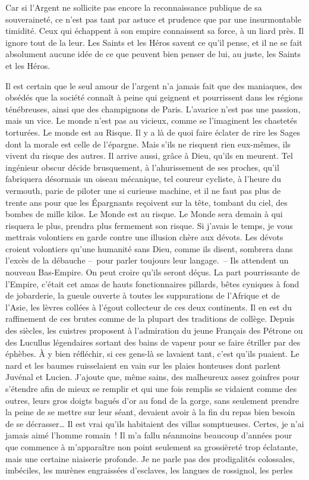 \documentclass[french,twoside]{book} %
\newcommand{\astertri}{\medskip\par\centerline{\color{rubric}\large\selectfont{\syms ✻\,✻\,✻}}\medskip\par}%
\begin{document}
\astertri

\noindent Car si l’Argent ne sollicite pas encore la reconnaissance publique de sa souveraineté, ce n’est pas tant par astuce et prudence que par une insurmontable timidité. Ceux qui échappent à son empire connaissent sa force, à un liard près. Il ignore tout de la leur. Les Saints et les Héros savent ce qu’il pense, et il ne se fait absolument aucune idée de ce que peuvent bien penser de lui, au juste, les Saints et les Héros.\par
Il est certain que le seul amour de l’argent n’a jamais fait que des maniaques, des obsédés que la société connaît à peine qui geignent et pourrissent dans les régions ténébreuses, ainsi que des champignons de Paris. L’avarice n’est pas une passion, mais un vice. Le monde n’est pas au vicieux, comme se l’imaginent les chastetés torturées. Le monde est au Risque. Il y a là de quoi faire éclater de rire les Sages dont la morale est celle de l’épargne. Mais s’ils ne risquent rien eux-mêmes, ils vivent du risque des autres. Il arrive aussi, grâce à Dieu, qu’ils en meurent. Tel ingénieur obscur décide brusquement, à l’ahurissement de ses proches, qu’il fabriquera désormais un oiseau mécanique, tel coureur cycliste, à l’heure du vermouth, parie de piloter une si curieuse machine, et il ne faut pas plus de trente ans pour que les Épargnants reçoivent sur la tête, tombant du ciel, des bombes de mille kilos. Le Monde est au risque. Le Monde sera demain à qui risquera le plus, prendra plus fermement son risque. Si j’avais le temps, je vous mettrais volontiers en garde contre une illusion chère aux dévots. Les dévots croient volontiers qu’une humanité sans Dieu, comme ils disent, sombrera dans l’excès de la débauche – pour parler toujours leur langage. – Ils attendent un nouveau Bas-Empire. On peut croire qu’ils seront déçus. La part pourrissante de l’Empire, c’était cet amas de hauts fonctionnaires pillards, bêtes cyniques à fond de jobarderie, la gueule ouverte à toutes les suppurations de l’Afrique et de l’Asie, les lèvres collées à l’égout collecteur de ces deux continents. Il en est du raffinement de ces brutes comme de la plupart des traditions de collège. Depuis des siècles, les cuistres proposent à l’admiration du jeune Français des Pétrone ou des Lucullus légendaires sortant des bains de vapeur pour se faire étriller par des éphèbes. À y bien réfléchir, si ces gens-là se lavaient tant, c’est qu’ils puaient. Le nard et les baumes ruisselaient en vain sur les plaies honteuses dont parlent Juvénal et Lucien. J’ajoute que, même sains, des malheureux assez goinfres pour s’étendre afin de mieux se remplir et qui une fois remplis se vidaient comme des outres, leurs gros doigts bagués d’or au fond de la gorge, sans seulement prendre la peine de se mettre sur leur séant, devaient avoir à la fin du repas bien besoin de se décrasser… Il est vrai qu’ils habitaient des villas somptueuses. Certes, je n’ai jamais aimé l’homme romain ! Il m’a fallu néanmoins beaucoup d’années pour que commence à m’apparaître non point seulement sa grossièreté trop éclatante, mais une certaine niaiserie profonde. Je ne parle pas des prodigalités colossales, imbéciles, les murènes engraissées d’esclaves, les langues de rossignol, les perles 
\end{document}
